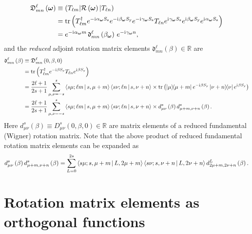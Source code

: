 \documentclass[nofootinbib,notitlepage,twocolumn]{revtex4-2}
\newcommand{\f}[2]{\dfrac{#1}{#2}} %
\newcommand{\p}[1]{\left(#1\right)} %
\newcommand{\bk}{\Braket} %
\renewcommand{\v}{\bm} %
\renewcommand{\i}{\mathrm{i}\mkern1mu} %
\newcommand{\1}{\mathds{1}}
\newcommand{\y}{\text{y}}
\newcommand{\z}{\text{z}}
\newcommand{\R}{\mathcal{R}}
\newcommand{\D}{\mathfrak{D}}
\renewcommand{\dd}{\mathfrak{d}}
\newcommand{\RR}{\mathbb{R}}
\def\obk#1{\mathinner{({#1})}}
\begin{document}
\begin{align}
  \D_{mn}^\ell\p{\v\omega}
  &\equiv \obk{T_{\ell m}|\R\p{\v\omega}|T_{\ell n}} \\
  &= \tr\p{T_{\ell m}^\dag e^{-\i\alpha_{\v\omega}S_\z} e^{-\i\beta_{\v\omega}S_\y} e^{-\i\gamma_{\v\omega}S_\z} T_{\ell n}
    e^{\i\gamma_{\v\omega}S_\z} e^{\i\beta_{\v\omega}S_\y} e^{\i\alpha_{\v\omega}S_\z}} \\
  &= e^{-\i\alpha_{\v\omega} m} \,\dd_{mn}^\ell\p{\beta_{\v\omega}}\, e^{-\i\gamma_{\v\omega} n},
\end{align}
and the {\it reduced} adjoint rotation matrix elements $\dd_{mn}^\ell\p{\beta}\in\RR$ are
\begin{align}
  \dd_{mn}^\ell\p{\beta}
  &\equiv \D_{mn}^\ell\p{0,\beta,0} \\
  &= \tr\p{T_{\ell m}^\dag e^{-\i\beta S_\y} T_{\ell n} e^{\i\beta S_\y}} \\
  &= \f{2\ell+1}{2s+1} \sum_{\mu,\nu=-s}^s
  \bk{s\mu;\ell m|s,\mu+m} \bk{s\nu;\ell n|s,\nu+n} \times
  \tr\p{\op{\mu}{\mu+m} e^{-\i\beta S_\y}
    \op{\nu+n}{\nu} e^{\i\beta S_\y}} \\
  &= \f{2\ell+1}{2s+1} \sum_{\mu,\nu=-s}^s
  \bk{s\mu;\ell m|s,\mu+m} \bk{s\nu;\ell n|s,\nu+n} \times
  d_{\mu\nu}^s\p{\beta} d_{\mu+m,\nu+n}^s\p{\beta}.
\end{align}
Here $d_{\mu\nu}^s\p{\beta}\equiv D^s_{\mu\nu}\p{0,\beta,0}\in\RR$ are
matrix elements of a reduced fundamental (Wigner) rotation matrix.
Note that the above product of reduced fundamental rotation matrix elements can be expanded as \cite{rose1957elementary}
\begin{align}
  d_{\mu\nu}^s\p{\beta} d_{\mu+m,\nu+n}^s\p{\beta}
  = \sum_{L=0}^{2s} \bk{s\mu;s,\mu+m|L,2\mu+m}
  \bk{s\nu;s,\nu+n|L,2\nu+n} d_{2\mu+m,2\nu+n}^L\p{\beta}.
\end{align}

\section{Rotation matrix elements as orthogonal functions}
\label{sec:ortho}
\end{document}
